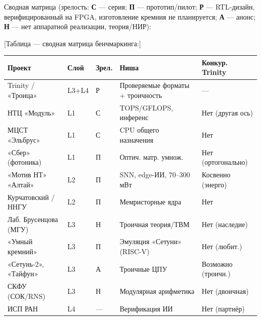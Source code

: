 \documentclass[
  russian,
]{article}
\begin{document}
Сводная матрица (зрелость: \textbf{С} --- серия; \textbf{П} ---
прототип/пилот; \textbf{Р} --- RTL-дизайн, верифицированный на FPGA, изготовление
кремния не планируется; \textbf{А} --- анонс; \textbf{Н} --- нет аппаратной реализации,
теория/НИР):

{[}Таблица --- сводная матрица бенчмаркинга:{]}

\begin{longtable}[]{@{}
  >{\raggedright\arraybackslash}p{}
  >{\raggedright\arraybackslash}p{}
  >{\centering\arraybackslash}p{}
  >{\raggedright\arraybackslash}p{}
  >{\raggedright\arraybackslash}p{}@{}}
\toprule\noalign{}
\begin{minipage}[b]{\linewidth}\raggedright
Проект
\end{minipage} & \begin{minipage}[b]{\linewidth}\raggedright
Слой
\end{minipage} & \begin{minipage}[b]{\linewidth}\centering
Зрел.
\end{minipage} & \begin{minipage}[b]{\linewidth}\raggedright
Ниша
\end{minipage} & \begin{minipage}[b]{\linewidth}\raggedright
Конкур. Trinity
\end{minipage} \\
\midrule\noalign{}
\endhead
\bottomrule\noalign{}
\endlastfoot
Trinity / «Троица» & L3+L4 & Р & Проверяемые форматы + троичность &
--- \\
НТЦ «Модуль» & L1 & С & TOPS/GFLOPS, инференс & Нет (другая ось) \\
МЦСТ «Эльбрус» & L1 & С & CPU общего назначения & Нет \\
«Сбер» (фотоника) & L1 & П & Оптич. матр. умнож. & Нет (ортогонально) \\
«Мотив НТ» «Алтай» & L2 & П & SNN, edge-ИИ, 70--300 мВт & Косвенно
(энерго) \\
Курчатовский / ННГУ & L2 & П & Мемристорные ядра & Нет \\
Лаб. Брусенцова (МГУ) & L3 & Н & Троичная теория/ТВМ & Нет (наследие) \\
«Умный кремний» & L3 & П & Эмуляция «Сетуни» (RISC-V) & Нет (любит.) \\
«Сетунь-2», «Тайфун» & L3 & А & Троичные ЦПУ & Возможно (троичн.) \\
СКФУ (СОК/RNS) & L3 & Н & Модулярная арифметика & Нет (двоичная) \\
ИСП РАН & L4 & --- & Верификация ИИ & Нет (партнёр) \\
\end{longtable}
\end{document}
